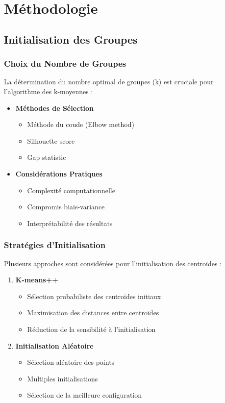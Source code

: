 \chapter{Méthodologie}

\section{Initialisation des Groupes}

\subsection{Choix du Nombre de Groupes}
La détermination du nombre optimal de groupes (k) est cruciale pour l'algorithme des k-moyennes :

\begin{itemize}
    \item \textbf{Méthodes de Sélection}
    \begin{itemize}
        \item Méthode du coude (Elbow method)
        \item Silhouette score
        \item Gap statistic
    \end{itemize}

    \item \textbf{Considérations Pratiques}
    \begin{itemize}
        \item Complexité computationnelle
        \item Compromis biais-variance
        \item Interprétabilité des résultats
    \end{itemize}
\end{itemize}

\subsection{Stratégies d'Initialisation}
Plusieurs approches sont considérées pour l'initialisation des centroïdes :

\begin{enumerate}
    \item \textbf{K-means++}
    \begin{itemize}
        \item Sélection probabiliste des centroïdes initiaux
        \item Maximisation des distances entre centroïdes
        \item Réduction de la sensibilité à l'initialisation
    \end{itemize}

    \item \textbf{Initialisation Aléatoire}
    \begin{itemize}
        \item Sélection aléatoire des points
        \item Multiples initialisations
        \item Sélection de la meilleure configuration
    \end{itemize}
\end{enumerate}

